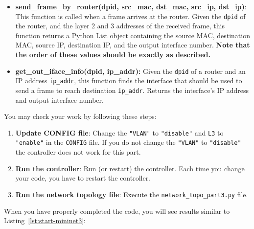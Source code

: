 \documentclass[11pt]{article}
\begin{document}
\begin{itemize}
    \item \textbf{send\_frame\_by\_router(dpid, src\_mac, dst\_mac, src\_ip, dst\_ip)}: This function is called when a frame arrives at the router. Given the \texttt{dpid} of the router, and the layer 2 and 3 addresses of the received frame, this function returns a Python List object containing the source MAC, destination MAC, source IP, destination IP, and the output interface number. \textbf{Note that the order of these values should be exactly as described.}

    \item \textbf{get\_out\_iface\_info(dpid, ip\_addr):} Given the \texttt{dpid} of a router and an IP address \texttt{ip\_addr}, this function finds the interface that should be used to send a frame to reach destination \texttt{ip\_addr}. Returns the interface's IP address and output interface number.
\end{itemize}

You may check your work by following these steps:
\begin{enumerate}
    \item \textbf{Update CONFIG file}: Change the \texttt{"VLAN"} to \texttt{"disable"} and \texttt{L3} to \texttt{"enable"} in the \texttt{CONFIG} file. If you do not change the \texttt{"VLAN"} to \texttt{"disable"} the controller does not work for this part.
    \item \textbf{Run the controller}: Run (or restart) the controller. Each time you change your code, you have to restart the controller.
    \item \textbf{Run the network topology file}: Execute the \texttt{network\_topo\_part3.py} file.
\end{enumerate}

When you have properly completed the code, you will see results similar to Listing~\ref{lst:start-mininet3}:
\end{document}
